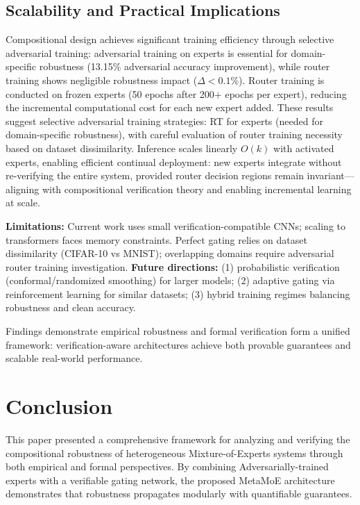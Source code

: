 \documentclass[11pt,a4paper]{article}
\begin{document}
\subsection{Scalability and Practical Implications}

Compositional design achieves significant training efficiency through selective adversarial training: adversarial training on experts is essential for domain-specific robustness (13.15\% adversarial accuracy improvement), while router training shows negligible robustness impact ($\Delta < 0.1\%$). Router training is conducted on frozen experts (50 epochs after 200+ epochs per expert), reducing the incremental computational cost for each new expert added. These results suggest selective adversarial training strategies: RT for experts (needed for domain-specific robustness), with careful evaluation of router training necessity based on dataset dissimilarity. Inference scales linearly $O(k)$ with activated experts, enabling efficient continual deployment: new experts integrate without re-verifying the entire system, provided router decision regions remain invariant—aligning with compositional verification theory and enabling incremental learning at scale.

\textbf{Limitations:} Current work uses small verification-compatible CNNs; scaling to transformers faces memory constraints. Perfect gating relies on dataset dissimilarity (CIFAR-10 vs MNIST); overlapping domains require adversarial router training investigation. \textbf{Future directions:} (1) probabilistic verification (conformal/randomized smoothing) for larger models; (2) adaptive gating via reinforcement learning for similar datasets; (3) hybrid training regimes balancing robustness and clean accuracy.

Findings demonstrate empirical robustness and formal verification form a unified framework: verification-aware architectures achieve both provable guarantees and scalable real-world performance.

\section{Conclusion}

This paper presented a comprehensive framework for analyzing and verifying the compositional robustness of heterogeneous Mixture-of-Experts systems through both empirical and formal perspectives. By combining Adversarially-trained experts with a verifiable gating network, the proposed MetaMoE architecture demonstrates that robustness propagates modularly with quantifiable guarantees.
\end{document}
